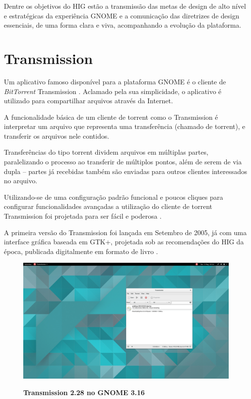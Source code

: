 Dentre os objetivos do HIG estão a transmissão das metas de design de alto nível
e estratégicas da experiência GNOME e a comunicação das diretrizes de design
essenciais, de uma forma clara e viva, acompanhando a evolução da plataforma.

\section{Transmission}

Um aplicativo famoso disponível para a plataforma GNOME é o cliente de
\textit{BitTorrent} Transmission \cite{transmission282}. Aclamado pela sua
simplicidade, o aplicativo é utilizado para compartilhar arquivos através da
Internet.

A funcionalidade básica de um cliente de torrent como o Transmission é
interpretar um arquivo que representa uma transferência (chamado de torrent), e
transferir os arquivos nele contidos.

Transferências do tipo torrent dividem arquivos em múltiplas partes,
paralelizando o processo ao transferir de múltiplos pontos, além de serem de via
dupla -- partes já recebidas também são enviadas para outros clientes
interessados no arquivo.

Utilizando-se de uma configuração padrão funcional e poucos cliques para
configurar funcionalidades avançadas a utilização do cliente de torrent
Transmission foi projetada para ser fácil e poderosa \cite{transmission-about}.

A primeira versão do Transmission foi lançada em Setembro de 2005, já com uma
interface gráfica baseada em GTK+, projetada sob as recomendações do HIG
da época, publicada digitalmente em formato de livro \cite{gnome221hig}.

\begin{figure}[!ht]
  \begin{center}
    \caption{\textbf{Transmission 2.28 no GNOME 3.16}}
    \includegraphics [width=\textwidth]{image/transmission/282-master/main-window.png}
    \label{transmission-master}
  \end{center}
\end{figure}

